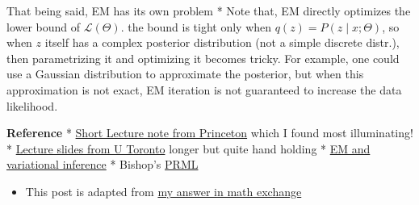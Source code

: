 \documentclass[
]{article}
\providecommand{\tightlist}{%
  \setlength{\itemsep}{0pt}\setlength{\parskip}{0pt}}
\begin{document}
That being said, EM has its own problem * Note that, EM directly
optimizes the lower bound of \(\mathcal L(\Theta)\). the bound is tight
only when \(q(z)=P(z\mid x;\Theta)\), so when \(z\) itself has a complex
posterior distribution (not a simple discrete distr.), then
parametrizing it and optimizing it becomes tricky. For example, one
could use a Gaussian distribution to approximate the posterior, but when
this approximation is not exact, EM iteration is not guaranteed to
increase the data likelihood.

\textbf{Reference} *
\href{https://www.cs.princeton.edu/courses/archive/spring08/cos424/scribe_notes/0311b}{Short
Lecture note from Princeton} which I found most illuminating! *
\href{https://www.cs.toronto.edu/~jlucas/teaching/csc411/lectures/lec15_16_handout.pdf}{Lecture
slides from U Toronto} longer but quite hand holding *
\href{https://chrischoy.github.io/research/Expectation-Maximization-and-Variational-Inference/}{EM
and variational inference} * Bishop's
\href{https://www.microsoft.com/en-us/research/people/cmbishop/prml-book/}{PRML}

\begin{itemize}
\tightlist
\item
  This post is adapted from
  \href{https://math.stackexchange.com/questions/4444592/em-algorithm-vs-gradient-descent/4450007\#4450007}{my
  answer in math exchange}
\end{itemize}
\end{document}
